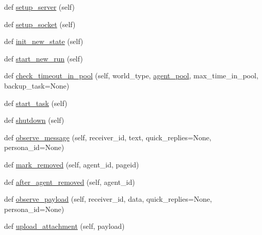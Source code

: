 \begin{DoxyCompactItemize}
\item 
def \hyperlink{classparlai_1_1chat__service_1_1core_1_1chat__service__manager_1_1ChatServiceManager_a147d73ca0427e9571a3c462d75412536}{setup\+\_\+server} (self)
\item 
def \hyperlink{classparlai_1_1chat__service_1_1core_1_1chat__service__manager_1_1ChatServiceManager_a167613812d6f3eaaa0fb1b36bf98be09}{setup\+\_\+socket} (self)
\item 
def \hyperlink{classparlai_1_1chat__service_1_1core_1_1chat__service__manager_1_1ChatServiceManager_a4aa33c8155ac0850476037f8809c8f22}{init\+\_\+new\+\_\+state} (self)
\item 
def \hyperlink{classparlai_1_1chat__service_1_1core_1_1chat__service__manager_1_1ChatServiceManager_a1a41f5cd5f08e44605cb73fbb6b7e310}{start\+\_\+new\+\_\+run} (self)
\item 
def \hyperlink{classparlai_1_1chat__service_1_1core_1_1chat__service__manager_1_1ChatServiceManager_a92c91891bbc88de69040bc979e9da468}{check\+\_\+timeout\+\_\+in\+\_\+pool} (self, world\+\_\+type, \hyperlink{classparlai_1_1chat__service_1_1core_1_1chat__service__manager_1_1ChatServiceManager_ab982b846a998e063c07a0edc5f8d34ef}{agent\+\_\+pool}, max\+\_\+time\+\_\+in\+\_\+pool, backup\+\_\+task=None)
\item 
def \hyperlink{classparlai_1_1chat__service_1_1core_1_1chat__service__manager_1_1ChatServiceManager_a207c63f2a66acae0dc8b04c528036e8b}{start\+\_\+task} (self)
\item 
def \hyperlink{classparlai_1_1chat__service_1_1core_1_1chat__service__manager_1_1ChatServiceManager_af2ba119314976bd2ae1524967fe9b1f1}{shutdown} (self)
\item 
def \hyperlink{classparlai_1_1chat__service_1_1core_1_1chat__service__manager_1_1ChatServiceManager_a9e1d99a460b0e21ec47e9a3ae09d73a0}{observe\+\_\+message} (self, receiver\+\_\+id, text, quick\+\_\+replies=None, persona\+\_\+id=None)
\item 
def \hyperlink{classparlai_1_1chat__service_1_1core_1_1chat__service__manager_1_1ChatServiceManager_acd647091b75f07e2d3744b0d895c9d8c}{mark\+\_\+removed} (self, agent\+\_\+id, pageid)
\item 
def \hyperlink{classparlai_1_1chat__service_1_1core_1_1chat__service__manager_1_1ChatServiceManager_a928461831de4bdb9fb240ae538d0b841}{after\+\_\+agent\+\_\+removed} (self, agent\+\_\+id)
\item 
def \hyperlink{classparlai_1_1chat__service_1_1core_1_1chat__service__manager_1_1ChatServiceManager_ae4aa62ecd0ff74a95a9d259f2297eace}{observe\+\_\+payload} (self, receiver\+\_\+id, data, quick\+\_\+replies=None, persona\+\_\+id=None)
\item 
def \hyperlink{classparlai_1_1chat__service_1_1core_1_1chat__service__manager_1_1ChatServiceManager_a7e2ef8f0e63e1078cbffccbcaa6719b0}{upload\+\_\+attachment} (self, payload)
\end{DoxyCompactItemize}
